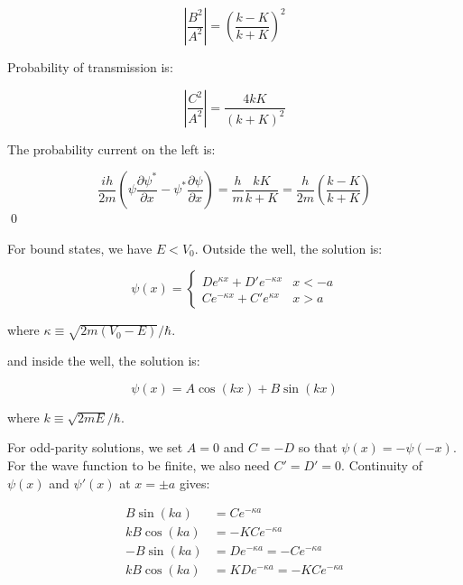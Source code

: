 \documentclass[12pt]{article}
\begin{document}
\begin{equation}
    \left\lvert \frac{B^{2}}{A^{2}} \right\rvert = \left( \frac{k - K}{k + K} \right)^{2}
\end{equation}

Probability of transmission is:

\begin{equation}
    \left\lvert \frac{C^{2}}{A^{2}} \right\rvert = \frac{4kK}{(k + K)^{2}}
\end{equation}

The probability current on the left is:

\begin{equation}
    \frac{ih}{2m} \left( \psi \frac{\partial \psi^{*}}{\partial x} - \psi^{*} \frac{\partial \psi}{\partial x} \right) = \frac{h}{m} \frac{kK}{k + K} = \frac{h}{2m} \left( \frac{k - K}{k + K} \right)
\end{equation}
\qed


For bound states, we have $E < V_{0}$. Outside the well, the solution is:

\begin{equation}
    \psi(x) =
    \begin{cases}
        De^{\kappa x} + D'e^{-\kappa x} & x < -a \\
        Ce^{-\kappa x} + C'e^{\kappa x} & x > a
    \end{cases}
\end{equation}

where $\kappa \equiv \sqrt{2m(V_{0} - E)}/\hbar$.

and inside the well, the solution is:

\begin{equation}
    \psi(x) = A\cos{(kx)} + B\sin{(kx)}
\end{equation}

where $k \equiv \sqrt{2mE}/\hbar$.

For odd-parity solutions, we set $A = 0$ and $C = -D$ so that $\psi(x) = -\psi(-x)$. For the wave function to be finite, we also need $C' = D' = 0$. Continuity of $\psi(x)$ and $\psi'(x)$ at $x = \pm a$ gives:

\begin{equation}
    \begin{split}
        B\sin{(ka)} &= Ce^{-\kappa a} \\
        kB\cos{(ka)} &= -KCe^{-\kappa a} \\
        -B\sin{(ka)} &= De^{-\kappa a} = -Ce^{-\kappa a} \\
        kB\cos{(ka)} &= KDe^{-\kappa a} = -KCe^{-\kappa a}
    \end{split}
\end{equation}
\end{document}

